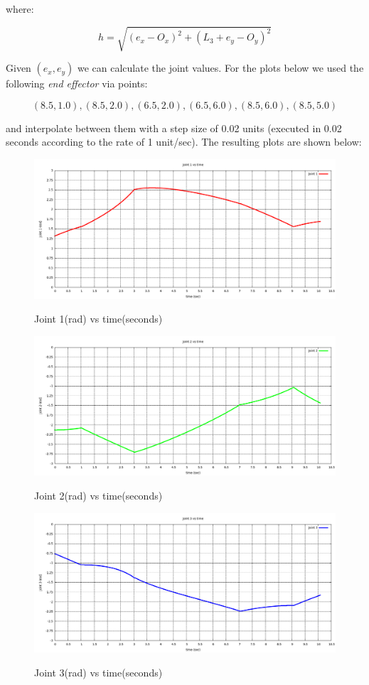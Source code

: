 \documentclass[10pt,a4paper]{article}
\begin{document}
where:

\[ h = \sqrt{ (e_{x} - O_{x})^{2} + (L_{3} + e_{y} - O_{y})^{2} }\]

Given $(e_{x},e_{y})$ we can calculate the joint values. For the plots below we used the following \textit{end effector} via points:

\[ (8.5, 1.0),(8.5,2.0),(6.5,2.0),(6.5,6.0),(8.5,6.0),(8.5,5.0) \]

and interpolate between them with a step size of 0.02 units (executed in 0.02 seconds according to the rate of 1 unit/sec). The resulting plots are shown below:

	\begin{figure}[H]
	\includegraphics[angle = 0, scale = 0.3]{figures/Joint1.png} 
	\label{fig:Joint1}
	\caption{ Joint 1(rad) vs time(seconds)}
	\end{figure}

	\begin{figure}[H]
	\includegraphics[angle = 0, scale = 0.3]{figures/Joint2.png} 
	\label{fig:Joint2}
	\caption{ Joint 2(rad) vs time(seconds)}
	\end{figure}
	
    \begin{figure}[H]
	\includegraphics[angle = 0, scale = 0.3]{figures/Joint3.png} 
	\label{fig:Joint3}
	\caption{ Joint 3(rad) vs time(seconds)}
	\end{figure}
\end{document}
